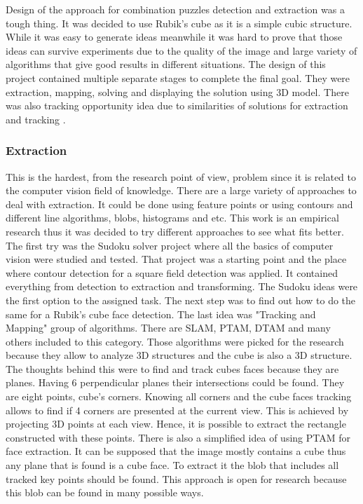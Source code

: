 \documentclass[../../main.tex]{subfiles}
\begin{document}
Design of the approach for combination puzzles detection and extraction was a tough thing. It was decided to use Rubik's cube as it is a simple cubic structure. While it was easy to generate ideas meanwhile it was hard to prove that those ideas can survive experiments due to the quality of the image and large variety of algorithms that give good results in different situations. The design of this project contained multiple separate stages to complete the final goal. They were extraction, mapping, solving and displaying the solution using 3D model. There was also tracking opportunity idea due to similarities of solutions for extraction and tracking \cite{puzzle_games_solver_q4_zakharov}.

\subsubsection*{Extraction}

This is the hardest, from the research point of view, problem since it is related to the computer vision field of knowledge. There are a large variety of approaches to deal with extraction. It could be done using feature points or using contours and different line algorithms, blobs, histograms and etc. This work is an empirical research thus it was decided to try different approaches to see what fits better. The first try was the Sudoku solver project where all the basics of computer vision were studied and tested. That project was a starting point and the place where contour detection for a square field detection was applied. It contained everything from detection to extraction and transforming. The Sudoku ideas were the first option to the assigned task. The next step was to find out how to do the same for a Rubik's cube face detection. The last idea was "Tracking and Mapping" group of algorithms. There are \ac{SLAM}, \ac{PTAM}, \ac{DTAM} and many others included to this category. Those algorithms were picked for the research because they allow to analyze 3D structures and the cube is also a 3D structure. The thoughts behind this were to find and track cubes faces because they are planes. Having 6 perpendicular planes their intersections could be found. They are eight points, cube's corners. Knowing all corners and the cube faces tracking allows to find if 4 corners are presented at the current view. This is achieved by projecting 3D points at each view. Hence, it is possible to extract the rectangle constructed with these points.
There is also a simplified idea of using \ac{PTAM} for face extraction. It can be supposed that the image mostly contains a cube thus any plane that is found is a cube face. To extract it the blob that includes all tracked key points should be found. This approach is open for research because this blob can be found in many possible ways.
\end{document}
